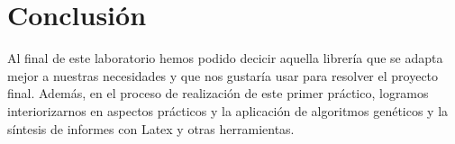 \documentclass[9pt,conference]{IEEEtran}
\begin{document}
	\section{Conclusi\'on}
	Al final de este laboratorio hemos podido decicir aquella librer\'ia que se adapta mejor a nuestras necesidades y que nos gustar\'ia usar para resolver el proyecto final. Adem\'as, en el proceso de realizaci\'on de este primer pr\'actico, logramos interiorizarnos en aspectos pr\'acticos y la aplicaci\'on de algoritmos gen\'eticos y la s\'intesis de informes con Latex y otras herramientas.



	
	{}
\end{document}
